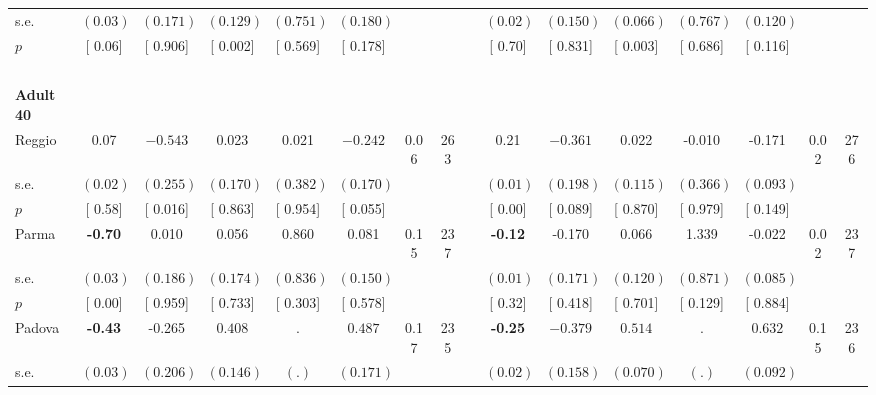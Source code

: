 \begin{longtable}{L{8em} c c c c c c c p{1em} c c c c c c c}
\quad \quad \quad \quad s.e.& $ (     0.03)$ & $ (    0.171)$ & $ (    0.129)$ & $ (    0.751)$ & $ (    0.180)$ & & & & $ (     0.02)$ & $ (    0.150)$ & $ (    0.066)$ & $ (    0.767)$ & $ (    0.120)$ & &  \\*
\quad \quad \quad \quad $ p$ & [     0.06] & [    0.906] & [    0.002] & [    0.569] & [    0.178] & & & & [     0.70] & [    0.831] & [    0.003] & [    0.686] & [    0.116] & &  \\[1em]
~\\[1em]
\quad \quad \textbf{Adult 40} & & & & & & & & & & & & & & & \\* 
\quad \quad \quad Reggio& 0.07 & $ \mathbf{   -0.543}$ &     0.023 &     0.021 & $ \mathbf{   -0.242}$ &      0.06 &       263 & & 0.21 & $ \mathbf{   -0.361}$ &     0.022 &    -0.010 &    -0.171 &      0.02 &       276  \\*
\quad \quad \quad \quad s.e.& $ (     0.02)$ & $ (    0.255)$ & $ (    0.170)$ & $ (    0.382)$ & $ (    0.170)$ & & & & $ (     0.01)$ & $ (    0.198)$ & $ (    0.115)$ & $ (    0.366)$ & $ (    0.093)$ & &  \\*
\quad \quad \quad \quad $ p$ & [     0.58] & [    0.016] & [    0.863] & [    0.954] & [    0.055] & & & & [     0.00] & [    0.089] & [    0.870] & [    0.979] & [    0.149] & &  \\[1em]
\quad \quad \quad Parma& \textbf{    -0.70} &     0.010 &     0.056 &     0.860 &     0.081 &      0.15 &       237 & & \textbf{    -0.12} &    -0.170 &     0.066 &     1.339 &    -0.022 &      0.02 &       237  \\*
\quad \quad \quad \quad s.e.& $ (     0.03)$ & $ (    0.186)$ & $ (    0.174)$ & $ (    0.836)$ & $ (    0.150)$ & & & & $ (     0.01)$ & $ (    0.171)$ & $ (    0.120)$ & $ (    0.871)$ & $ (    0.085)$ & &  \\*
\quad \quad \quad \quad $ p$ & [     0.00] & [    0.959] & [    0.733] & [    0.303] & [    0.578] & & & & [     0.32] & [    0.418] & [    0.701] & [    0.129] & [    0.884] & &  \\[1em]
\quad \quad \quad Padova& \textbf{    -0.43} &    -0.265 & $ \mathbf{    0.408}$ &         . & $ \mathbf{    0.487}$ &      0.17 &       235 & & \textbf{    -0.25} & $ \mathbf{   -0.379}$ & $ \mathbf{    0.514}$ &         . & $ \mathbf{    0.632}$ &      0.15 &       236  \\*
\quad \quad \quad \quad s.e.& $ (     0.03)$ & $ (    0.206)$ & $ (    0.146)$ & $ (        .)$ & $ (    0.171)$ & & & & $ (     0.02)$ & $ (    0.158)$ & $ (    0.070)$ & $ (        .)$ & $ (    0.092)$ & &  \\*

\end{longtable}
